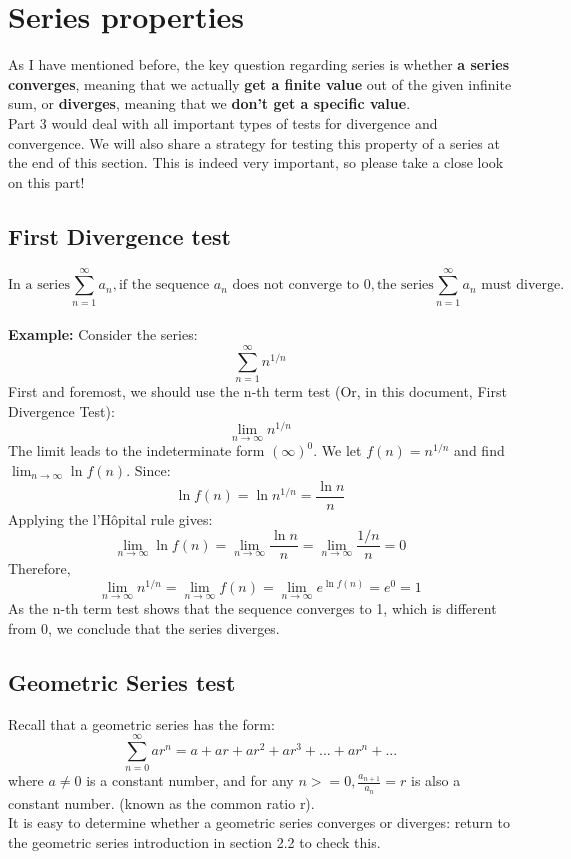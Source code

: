 \documentclass{article}
\begin{document}
\section{Series properties}
As I have mentioned before, the key question regarding series is whether \textbf{a series converges}, meaning that we actually \textbf{get a finite value} out of the given infinite sum, or \textbf{diverges}, meaning that we \textbf{don’t get a specific value}. \\
Part 3 would deal with all important types of tests for divergence and convergence. We will also share a strategy for testing this property of a series at the end of this section. This is indeed very important, so please take a close look on this part!
    
\subsection{First Divergence test}
$$\text{In a series} \sum_{n=1}^{\infty} a_n, \text{if the sequence } a_n \text{ does not converge to } 0, \text{the series}  \sum_{n=1}^{\infty} a_n \text{ must diverge.}$$
\\
\textbf{Example:} Consider the series: 
$$ \sum_{n=1}^{\infty} n^{1/n}$$
First and foremost, we should use the n-th term test (Or, in this document, First Divergence Test):
$$ \lim_{n\to\infty} n^{1/n} $$
The limit leads to the indeterminate form $(\infty)^0. $ We let $ f(n) = n ^ {1/n}$ and find $\lim_{n\to\infty} \ln{f(n)}. $ Since:
$$ \ln{f(n)} = \ln{n^{1/n}} = \frac{\ln{n}}{n}$$
Applying the l'Hôpital rule gives: 
   $$ \lim_{n\to\infty} \ln{f(n)} = \lim_{n\to\infty} \frac{\ln{n}}{n} 
    = \lim_{n\to\infty} \frac{1/n}{n} = 0$$
Therefore, 
$$ \lim_{n\to\infty} n^{1/n} = \lim_{n\to\infty} f(n) =  \lim_{n\to\infty} e^{\ln{f(n)}} = e^0 = 1 $$
As the n-th term test shows that the sequence converges to 1, which is different from 0, we conclude that the series diverges. 

 \subsection{Geometric Series test}
Recall that a geometric series has the form: 
 $$\sum_{n=0}^{\infty} ar^n = a + ar + ar^2 + ar^3 + ... + ar^n + ...$$
where $a \neq 0 $ is a constant number, and for any $n>= 0, \frac{a_{n+1}}{a_n} = r$ is also a constant number. (known as the common ratio r). \\
It is easy to determine whether a geometric series converges or diverges: return to the geometric series introduction in section 2.2 to check this. 
\end{document}
